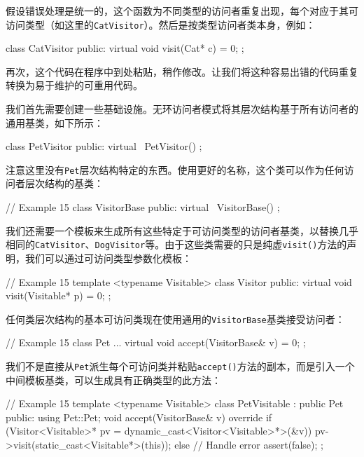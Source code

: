 \begin{code}
{假设错误处理是统一的，这个函数为不同类型的访问者重复出现，每个对应于其可访问类型（如这里的\texttt{CatVisitor}）。然后是按类型访问者类本身，例如：

\begin{code}
class CatVisitor {
  public:
  virtual void visit(Cat* c) = 0;
};
\end{code}

再次，这个代码在程序中到处粘贴，稍作修改。让我们将这种容易出错的代码重复转换为易于维护的可重用代码。

我们首先需要创建一些基础设施。无环访问者模式将其层次结构基于所有访问者的通用基类，如下所示：

\begin{code}
class PetVisitor {
  public:
  virtual ~PetVisitor() {}
};
\end{code}

注意这里没有\texttt{Pet}层次结构特定的东西。使用更好的名称，这个类可以作为任何访问者层次结构的基类：

\begin{code}
// Example 15
class VisitorBase {
  public:
  virtual ~VisitorBase() {}
};
\end{code}

我们还需要一个模板来生成所有这些特定于可访问类型的访问者基类，以替换几乎相同的\texttt{CatVisitor}、\texttt{DogVisitor}等。由于这些类需要的只是纯虚\texttt{visit()}方法的声明，我们可以通过可访问类型参数化模板：

\begin{code}
// Example 15
template <typename Visitable> class Visitor {
  public:
  virtual void visit(Visitable* p) = 0;
};
\end{code}

任何类层次结构的基本可访问类现在使用通用的\texttt{VisitorBase}基类接受访问者：

\begin{code}
// Example 15
class Pet {
  ...
  virtual void accept(VisitorBase& v) = 0;
};
\end{code}

我们不是直接从\texttt{Pet}派生每个可访问类并粘贴\texttt{accept()}方法的副本，而是引入一个中间模板基类，可以生成具有正确类型的此方法：

\begin{code}
// Example 15
template <typename Visitable>
class PetVisitable : public Pet {
  public:
  using Pet::Pet;
  void accept(VisitorBase& v) override {
    if (Visitor<Visitable>* pv =
        dynamic_cast<Visitor<Visitable>*>(&v)) {
      pv->visit(static_cast<Visitable*>(this));
    } else { // Handle error
      assert(false);
    }
 }
};
\end{code}

}
\end{code}
